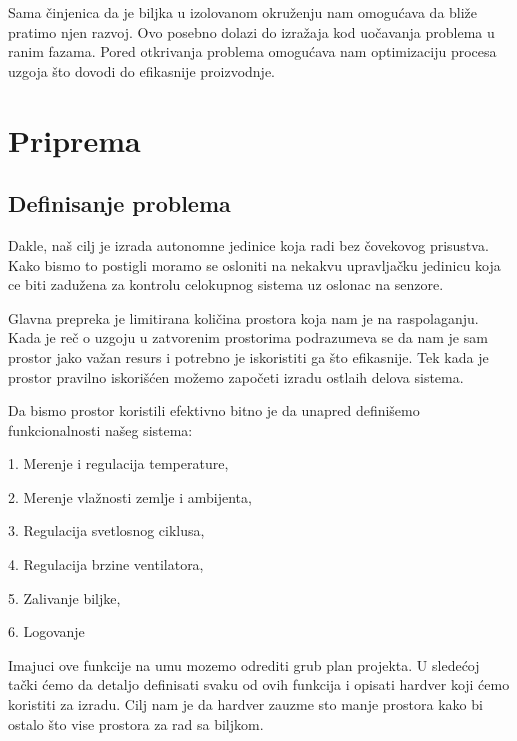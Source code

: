 \documentclass[a4paper,11pt]{book}
\makeatletter
\newenvironment{chapquote}[2][2em]
  {\setlength{\@tempdima}{#1}%
   \def\chapquote@author{#2}%
   \parshape 1 \@tempdima \dimexpr\textwidth-2\@tempdima\relax%
   \itshape}
  {\par\normalfont\hfill--\ \chapquote@author\hspace*{\@tempdima}\par\bigskip}
\makeatother
\begin{document}
\noindent Sama činjenica da je biljka u izolovanom okruženju nam omogućava da bliže pratimo njen razvoj. Ovo posebno dolazi do izražaja kod uočavanja problema u ranim fazama. Pored otkrivanja problema omogućava nam optimizaciju procesa uzgoja što dovodi do efikasnije proizvodnje.

\chapter{Priprema}


\section{Definisanje problema}
Dakle, naš cilj je izrada autonomne jedinice koja radi bez čovekovog prisustva. Kako bismo to postigli moramo se osloniti na nekakvu upravljačku jedinicu koja ce biti zadužena za kontrolu celokupnog sistema uz oslonac na senzore. 

Glavna prepreka je limitirana količina prostora koja nam je na raspolaganju. Kada je reč o uzgoju u zatvorenim prostorima podrazumeva se da nam je sam prostor jako važan resurs i potrebno je iskoristiti ga što efikasnije. Tek kada je prostor pravilno iskorišćen možemo započeti izradu ostlaih delova sistema.

Da bismo prostor koristili efektivno bitno je da unapred definišemo funkcionalnosti našeg sistema: 

\hrulefill

1. Merenje i regulacija temperature,

2. Merenje vlažnosti zemlje i ambijenta,

3. Regulacija svetlosnog ciklusa,

4. Regulacija brzine ventilatora,

5. Zalivanje biljke,

6. Logovanje 

\hrulefill

\noindent Imajuci ove funkcije na umu mozemo odrediti grub plan projekta. U sledećoj tački ćemo da detaljo definisati svaku od ovih funkcija i opisati hardver koji ćemo koristiti za izradu. Cilj nam je da hardver zauzme sto manje prostora kako bi ostalo što vise prostora za rad sa biljkom.
\end{document}
